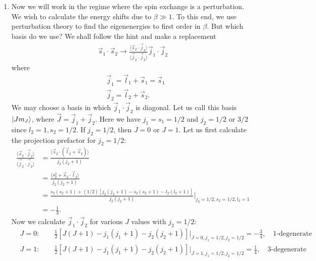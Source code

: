 \documentclass{article}
\theoremstyle{definition}
\newcommand{\be}{\beta}
\newcommand{\f}[2]{\frac{#1}{#2}}
\begin{document}
\begin{enumerate}[label=(\alph*)]
	
	\item Now we will work in the regime where the spin exchange is a perturbation.  We wish to calculate the energy shifts due to $\be \gg 1$. To this end, we use perturbation theory to find the eigenenergies to first order in $\be$. But which basis do we use? We shall follow the hint and make a replacement 
	\begin{align*}
	\vec{s}_1 \cdot \vec{s}_2 \to \f{\langle \vec{s}_2 \cdot \vec{j}_2 \rangle}{\langle \vec{j}_2 \cdot \vec{j}_2\rangle} \vec{j}_1 \cdot \vec{j}_2
	\end{align*}
	where 
	\begin{align*}
	&\vec{j}_1 = \vec{l}_1 + \vec{s}_1 = \vec{s}_1\\
	&\vec{j}_2 = \vec{l}_2 + \vec{s}_2 .
	\end{align*}
	We may choose a basis in which $\vec{j}_1\cdot \vec{j}_2$ is diagonal. Let us call this basis $\ket{J m_J}$, where $\vec{J} = \vec{j}_1 + \vec{j}_2$. Here we have $j_1 = s_1 = 1/2$ and $j_2 =  1/2$ or $3/2$ since $l_2 = 1, s_2 = 1/2$.  If $j_2=1/2$, then $J=0$ or $J=1$. Let us first calculate the projection prefactor for $j_2=1/2$:
	\begin{align*}
	\f{\langle \vec{s}_2 \cdot \vec{j}_2 \rangle}{\langle \vec{j}_2 \cdot \vec{j}_2\rangle} 
	&= \f{\langle \vec{s}_2 \cdot (\vec{l}_2 + \vec{s}_2)\rangle }{j_2(j_2+1)}  \\
	&= \f{\langle s_2^2 + \vec{s}_2\cdot \vec{l}_2  \rangle }{j_2(j_2+1)}  \\
	&= \f{s_2(s_2+1) +(1/2)[j_2(j_2+1) - s_2(s_2+1) - l_2(l_2+1)]}{j_2(j_2+1)}\bigg\vert_{j_2=1/2,s_2=1/2,l_2 =1}\\
	&= -\f{1}{3}.
	\end{align*}
	Now we calculate $\vec{j}_1\cdot \vec{j}_2$ for various $J$ values with $j_2=1/2$:
	\begin{align*}
	&J=0: \quad\quad \f{1}{2}[J(J+1)-j_1(j_1+1)-j_2(j_2+1)]\bigg\vert_{J=0,j_1=1/2,j_2=1/2} =  -\f{3}{4}, \quad \text{1-degenerate} \\
	&J=1: \quad\quad \f{1}{2}[J(J+1)-j_1(j_1+1)-j_2(j_2+1)]\bigg\vert_{J=1,j_1=1/2,j_2=1/2} =  \f{1}{4},\quad \text{3-degenerate} 
	\end{align*}
	
	
	
	
	

\end{enumerate}
\end{document}

